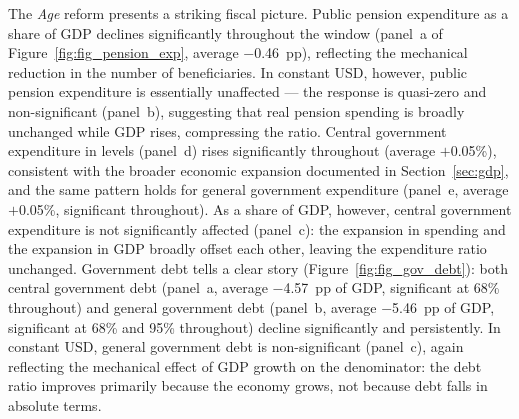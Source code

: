 \documentclass[11pt,english,a4paper, twoside, authoryear]{article}
\begin{document}
The \textit{Age} reform presents a striking fiscal picture. Public pension expenditure as a share of GDP declines significantly throughout the window (panel~a of Figure~\ref{fig:fig_pension_exp}, average $-$0.46~pp), reflecting the mechanical reduction in the number of beneficiaries. In constant USD, however, public pension expenditure is essentially unaffected --- the response is quasi-zero and non-significant (panel~b), suggesting that real pension spending is broadly unchanged while GDP rises, compressing the ratio. Central government expenditure in levels (panel~d) rises significantly throughout (average $+$0.05\%), consistent with the broader economic expansion documented in Section~\ref{sec:gdp}, and the same pattern holds for general government expenditure (panel~e, average $+$0.05\%, significant throughout).  As a share of GDP, however, central government expenditure is not significantly affected (panel~c): the expansion in spending and the expansion in GDP broadly offset each other, leaving the expenditure ratio unchanged. Government debt tells a clear story (Figure~\ref{fig:fig_gov_debt}): both central government debt (panel~a, average $-$4.57~pp of GDP, significant at 68\% throughout) and general government debt (panel~b, average $-$5.46~pp of GDP, significant at 68\% and 95\% throughout) decline significantly and persistently. In constant USD, general government debt is non-significant (panel~c), again reflecting the mechanical effect of GDP growth on the denominator: the debt ratio improves primarily because the economy grows, not because debt falls in absolute terms.



\end{document}
